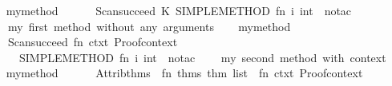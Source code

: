 \begin{isabellebody}
\begin{isamarkuptext}
\begin{description}
  \end{description}%
\end{isamarkuptext}%
\isamarkuptrue%
%
\isadelimML
\ \ %
\endisadelimML
%
\isatagML
{}\isamarkupfalse%
\ my{}method{}\ {}\ {}\isanewline
\ \ \ \ Scan{}succeed\ {}K\ {}SIMPLE{}METHOD{}\ {}fn\ i{}\ int\ {}{}\ no{}tac{}{}{}\isanewline
\ \ {}\ \ {}my\ first\ method\ {}without\ any\ arguments{}{}\isanewline
\isanewline
\ \ \isamarkupfalse%
\ my{}method{}\ {}\ {}\isanewline
\ \ \ \ Scan{}succeed\ {}fn\ ctxt{}\ Proof{}context\ {}{}\isanewline
\ \ \ \ \ \ SIMPLE{}METHOD{}\ {}fn\ i{}\ int\ {}{}\ no{}tac{}{}\isanewline
\ \ {}\ \ {}my\ second\ method\ {}with\ context{}{}\isanewline
\isanewline
\ \ \isamarkupfalse%
\ my{}method{}\ {}\ {}\isanewline
\ \ \ \ Attrib{}thms\ {}{}\ {}fn\ thms{}\ thm\ list\ {}{}\ fn\ ctxt{}\ Proof{}context\ {}{}\isanewline

\end{isabellebody}
